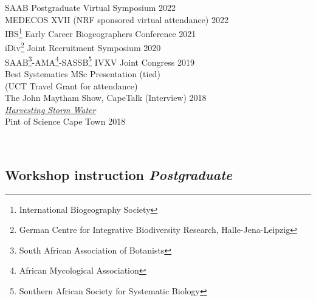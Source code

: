 \documentclass[10pt]{article}
\begin{document}
\begin{multicols}{2}
SAAB Postgraduate Virtual Symposium                      \hfill {\small 2022} \\
MEDECOS XVII {\small (NRF sponsored virtual attendance)} \hfill {\small 2022} \\
IBS\footnote{International Biogeography Society}
  Early Career Biogeographers Conference                 \hfill {\small 2021} \\
iDiv\footnote{
    German Centre for Integrative Biodiversity Research, Halle-Jena-Leipzig}
  Joint Recruitment Symposium                            \hfill {\small 2020} \\
SAAB\footnote{
    South African Association of Botanists}-AMA\footnote{
      African Mycological Association}-SASSB\footnote{
        Southern African Society for Systematic Biology}
  IVXV Joint Congress                                    \hfill {\small 2019} \\
  \hspace{2em} {\small Best Systematics MSc Presentation (tied)}              \\
  \hspace{2em} {\small (UCT Travel Grant for attendance)}                     \\
The John Maytham Show, CapeTalk     {\small (Interview)} \hfill {\small 2018} \\
  \hspace{2em} {\small \href{https://www.capetalk.co.za/articles/328900/harvesting-stormwater-from-liesbeek-river-may-aid-ct-water-supply-students-find}
                            {\textit{Harvesting Storm Water}}}                \\
Pint of Science Cape Town                                \hfill {\small 2018}

\vfill
\
\columnbreak

\subsection*{Workshop instruction %
                                 \hfill {\small \textmd{\textit{Postgraduate}}}}


\end{multicols}
\end{document}

